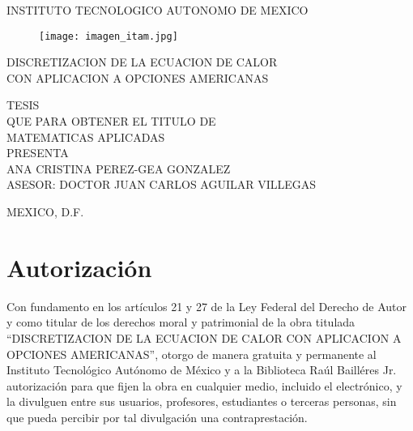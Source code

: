 \documentclass[11pt,letterpaper]{book}
\theoremstyle{definition}
\begin{document}
\frontmatter
\begin{titlepage}
\begin{center}
\Large

INSTITUTO TECNOLOGICO AUTONOMO DE MEXICO\\

\begin{figure}[H]
\centering
\texttt{[image: imagen\_itam.jpg]}
\end{figure}

\vspace{1cm}

DISCRETIZACION DE LA ECUACION DE CALOR \\
CON APLICACION A OPCIONES AMERICANAS\\

\vspace{1cm}

TESIS\\
QUE PARA OBTENER EL TITULO DE \\
MATEMATICAS APLICADAS\\
PRESENTA\\

\vspace{1cm}
ANA CRISTINA PEREZ-GEA GONZALEZ\\

\vspace{1cm}
ASESOR: DOCTOR JUAN CARLOS AGUILAR VILLEGAS\\

\vfill
\begin{minipage}{.45\textwidth}
\flushleft
MEXICO, D.F.
\end{minipage} \begin{minipage}{.45\textwidth}
\end{minipage}


\end{center}
\end{titlepage}




\chapter*{Autorización}


Con fundamento en los artículos 21 y 27 de la Ley Federal del Derecho de Autor y como titular de los derechos moral y patrimonial de la obra titulada ``DISCRETIZACION DE LA ECUACION DE CALOR CON APLICACION A OPCIONES AMERICANAS'', otorgo de manera gratuita y permanente al Instituto Tecnológico Autónomo de México y a la Biblioteca Raúl Bailléres Jr. autorización para que fijen la obra en cualquier medio, incluido el electrónico, y la divulguen entre sus usuarios, profesores, estudiantes o terceras personas, sin que pueda percibir por tal divulgación una contraprestación.
\end{document}
